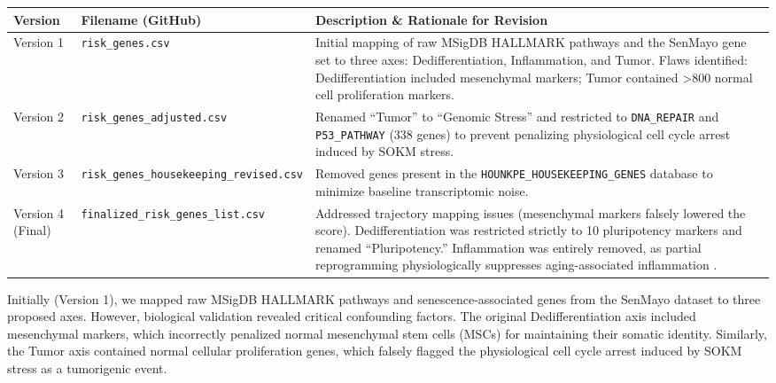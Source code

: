 \documentclass[10pt,twocolumn]{article}
\newcommand{\SOKM}{SOKM}
\begin{document}
\begin{strip}
\noindent\begin{minipage}{\textwidth}
\centering
{}
\label{tab:gene-lists}
\small
\begin{tabularx}{\textwidth}{l l X}
\toprule
\textbf{Version} & \textbf{Filename (GitHub)} & \textbf{Description \& Rationale for Revision} \\
\midrule
Version 1 & \texttt{risk\_genes.csv} & Initial mapping of raw MSigDB HALLMARK pathways \citep{liberzon2015} and the SenMayo gene set \citep{saul2022} to three axes: Dedifferentiation, Inflammation, and Tumor. Flaws identified: Dedifferentiation included mesenchymal markers; Tumor contained >800 normal cell proliferation markers. \\
Version 2 & \texttt{risk\_genes\_adjusted.csv} & Renamed ``Tumor'' to ``Genomic Stress'' and restricted to \texttt{DNA\_REPAIR} and \texttt{P53\_PATHWAY} (338 genes) to prevent penalizing physiological cell cycle arrest induced by \SOKM{} stress. \\
Version 3 & \texttt{risk\_genes\_housekeeping\_revised.csv} & Removed genes present in the \texttt{HOUNKPE\_HOUSEKEEPING\_GENES} database \citep{hounkpe2021} to minimize baseline transcriptomic noise. \\
Version 4 (Final) & \texttt{finalized\_risk\_genes\_list.csv} & Addressed trajectory mapping issues (mesenchymal markers falsely lowered the score). Dedifferentiation was restricted strictly to 10 pluripotency markers and renamed ``Pluripotency.'' Inflammation was entirely removed, as partial reprogramming physiologically suppresses aging-associated inflammation \citep{roux2022}. \\
\bottomrule
\end{tabularx}
\end{minipage}
\end{strip}

Initially (Version 1), we mapped raw MSigDB HALLMARK pathways \citep{liberzon2015} and senescence-associated genes from the SenMayo dataset \citep{saul2022} to three proposed axes. However, biological validation revealed critical confounding factors. The original Dedifferentiation axis included mesenchymal markers, which incorrectly penalized normal mesenchymal stem cells (MSCs) for maintaining their somatic identity. Similarly, the Tumor axis contained normal cellular proliferation genes, which falsely flagged the physiological cell cycle arrest induced by \SOKM{} stress as a tumorigenic event.
\end{document}
